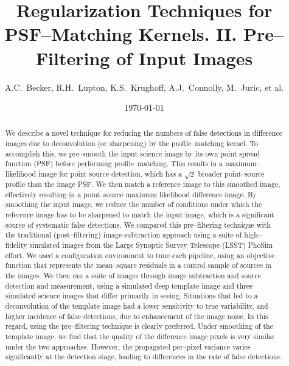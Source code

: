 \documentclass[iop]{emulateapj}
\begin{document}
\title{Regularization Techniques for PSF--Matching Kernels. II. Pre--Filtering of Input Images}

\author{
A.C.~Becker,
R.H.~Lupton,
K.S.~Krughoff,
A.J.~Connolly,
M.~Juric,
et al.
}

\date{\today}

\begin{abstract}

We describe a novel technique for reducing the numbers of false detections in difference images due to deconvolution (or sharpening) by the profile--matching kernel.
To accomplish this, we pre--smooth the input science image by its own point spread function (PSF) before performing profile--matching.
This results in a maximum--likelihood image for point source detection, which has a $\sqrt{2}$ broader point--source profile than the image PSF.
We then match a reference image to this smoothed image, effectively resulting in a point--source maximum likelihood difference image.
By smoothing the input image, we reduce the number of conditions under which the reference image has to be sharpened to match the input image, which is a significant source of systematic false detections.
We compared this pre--filtering technique with the traditional (post--filtering) image subtraction approach using a suite of high--fidelity simulated images from the Large Synoptic Survey Telescope (LSST) PhoSim effort.
We used a configuration environment to tune each pipeline, using an objective function that represents the mean--square residuals in a control sample of sources in the images.
We then ran a suite of images through image subtraction and source detection and measurement, using a simulated deep template image and three simulated science images that differ primarily in seeing.
Situations that led to a deconvolution of the template image had a lower sensitivity to true variability, and higher incidence of false detections, due to enhancement of the image noise.
In this regard, using the pre--filtering technique is clearly preferred.
Under smoothing of the template image, we find that the quality of the difference image pixels is very similar under the two approaches.
However, the propagated per--pixel variance varies significantly at the detection stage, leading to differences in the rate of false detections.

\end{abstract}
\end{document}
